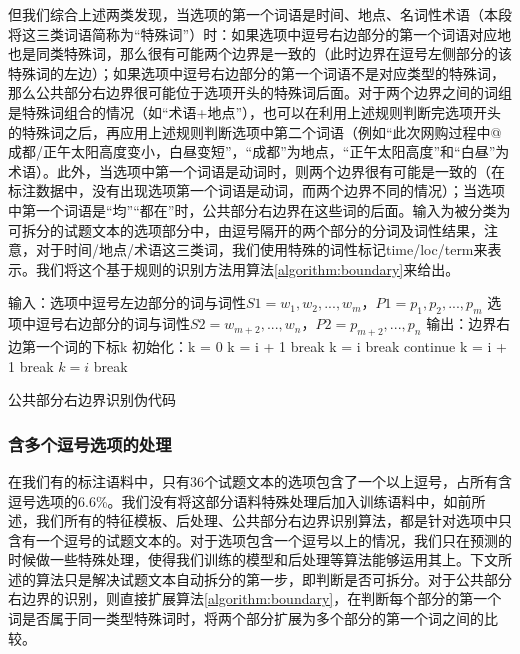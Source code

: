 \documentclass[master, winfont]{njuthesis}
\begin{document}
但我们综合上述两类发现，当选项的第一个词语是时间、地点、名词性术语（本段将这三类词语简称为“特殊词”）时：如果选项中逗号右边部分的第一个词语对应地也是同类特殊词，那么很有可能两个边界是一致的（此时边界在逗号左侧部分的该特殊词的左边）；如果选项中逗号右边部分的第一个词语不是对应类型的特殊词，那么公共部分右边界很可能位于选项开头的特殊词后面。对于两个边界之间的词组是特殊词组合的情况（如“术语+地点”），也可以在利用上述规则判断完选项开头的特殊词之后，再应用上述规则判断选项中第二个词语（例如“此次网购过程中@成都/正午太阳高度变小，白昼变短”，“成都”为地点，“正午太阳高度”和“白昼”为术语）。此外，当选项中第一个词语是动词时，则两个边界很有可能是一致的（在标注数据中，没有出现选项第一个词语是动词，而两个边界不同的情况）；当选项中第一个词语是“均”“都在”时，公共部分右边界在这些词的后面。输入为被分类为可拆分的试题文本的选项部分中，由逗号隔开的两个部分的分词及词性结果，注意，对于时间/地点/术语这三类词，我们使用特殊的词性标记time/loc/term来表示。我们将这个基于规则的识别方法用算法\ref{algorithm:boundary}来给出。

\begin{algorithm}
\begin{algorithmic}[1]
\STATE 输入：选项中逗号左边部分的词与词性$S1={w_1, w_2, ..., w_m}$，$P1={p_1, p_2, ..., p_m}$
\STATE      选项中逗号右边部分的词与词性$S2={w_{m+2}, ..., w_n}$，$P2={p_{m+2}, ..., p_n}$
\STATE 输出：边界右边第一个词的下标k
\STATE 初始化：k = 0
		\STATE k = i + 1
		\STATE break
		\STATE k = i
		\STATE break
		\STATE continue
		\STATE k = i + 1
		\STATE break
	\ELSE
		\STATE $k = i$
    	\STATE break
    \ENDIF
\ENDFOR
\end{algorithmic}
\caption{\label{algorithm:boundary}公共部分右边界识别伪代码}
\end{algorithm}

\subsubsection{含多个逗号选项的处理}
在我们有的标注语料中，只有36个试题文本的选项包含了一个以上逗号，占所有含逗号选项的6.6\%。我们没有将这部分语料特殊处理后加入训练语料中，如前所述，我们所有的特征模板、后处理、公共部分右边界识别算法，都是针对选项中只含有一个逗号的试题文本的。对于选项包含一个逗号以上的情况，我们只在预测的时候做一些特殊处理，使得我们训练的模型和后处理等算法能够运用其上。下文所述的算法只是解决试题文本自动拆分的第一步，即判断是否可拆分。对于公共部分右边界的识别，则直接扩展算法\ref{algorithm:boundary}，在判断每个部分的第一个词是否属于同一类型特殊词时，将两个部分扩展为多个部分的第一个词之间的比较。
\end{document}
